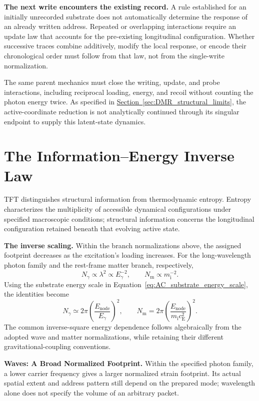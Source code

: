 \medskip
\noindent\textbf{The next write encounters the existing record.}
A rule established for an initially unrecorded substrate does not automatically determine the response of an already written address. Repeated or overlapping interactions require an update law that accounts for the pre-existing longitudinal configuration. Whether successive traces combine additively, modify the local response, or encode their chronological order must follow from that law, not from the single-write normalization.

The same parent mechanics must close the writing, update, and probe interactions, including reciprocal loading, energy, and recoil without counting the photon energy twice. As specified in \hyperref[sec:DMR_structural_limits]{Section~\ref*{sec:DMR_structural_limits}}, the active-coordinate reduction is not analytically continued through its singular endpoint to supply this latent-state dynamics.

\section{The Information--Energy Inverse Law}
\label{sec:AC_information_energy_inverse}

TFT distinguishes structural information from thermodynamic entropy. Entropy characterizes the multiplicity of accessible dynamical configurations under specified macroscopic conditions; structural information concerns the longitudinal configuration retained beneath that evolving active state.

\noindent\textbf{The inverse scaling.}
Within the branch normalizations above, the assigned footprint decreases as the excitation's loading increases. For the long-wavelength photon family and the rest-frame matter branch, respectively,
\[
    N_\gamma\propto\lambda^{2}\propto E_\gamma^{-2},
    \qquad
    N_{\mathrm m}\propto m_{\mathrm i}^{-2}.
\]
Using the substrate energy scale in Equation~\eqref{eq:AC_substrate_energy_scale}, the identities become
\[
    N_\gamma
    \simeq2\pi\left(\frac{E_{\mathrm{node}}}{E_\gamma}\right)^{2},
    \qquad
    N_{\mathrm m}
    =2\pi\left(
    \frac{E_{\mathrm{node}}}{m_{\mathrm i}c_{\mathrm E}^{2}}
    \right)^{2}.
\]
The common inverse-square energy dependence follows algebraically from the adopted wave and matter normalizations, while retaining their different gravitational-coupling conventions.

\medskip
\noindent\textbf{Waves: A Broad Normalized Footprint.}
Within the specified photon family, a lower carrier frequency gives a larger normalized strain footprint. Its actual spatial extent and address pattern still depend on the prepared mode; wavelength alone does not specify the volume of an arbitrary packet.

